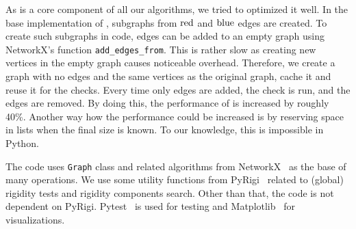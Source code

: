 As \IsNACColoring{} is a core component of all our algorithms,
we tried to optimized it well.
%
In the base implementation of \IsNACColoring{},
subgraphs from \( \text{red} \) and \( \text{blue} \) edges are created.
To create such subgraphs in code, edges can be added to an empty graph
using NetworkX's function \texttt{add\_edges\_from}.
%
This is rather slow as creating new vertices in the empty graph causes noticeable overhead.
Therefore, we create a graph with no edges and the same vertices as the original graph,
cache it and reuse it for the checks.
Every time only edges are added, the check is run, and the edges are removed.
By doing this, the performance of \IsNACColoring{} is increased by roughly 40\%.
%
Another way how the performance could be increased is by reserving space in lists
when the final size is known.
To our knowledge, this is impossible in Python.

The code uses \texttt{Graph} class and related algorithms from NetworkX~\cite{networkx}
as the base of many operations. We use some utility functions from PyRigi~\cite{pyrigi}
related to (global) rigidity tests and rigidity components search.
Other than that, the code is not dependent on PyRigi.
%
Pytest~\cite{pytest} is used for testing and
Matplotlib~\cite{matplotlib} for visualizations.
